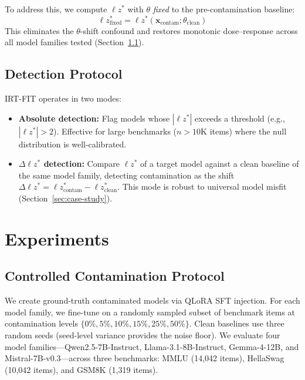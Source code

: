 \documentclass[11pt,a4paper]{article}
\begin{document}
To address this, we compute $\ell z^*$ with $\theta$ \emph{fixed} to the pre-contamination baseline:
\begin{equation}
\ell z^*_{\text{fixed}} = \ell z^*(\mathbf{x}_{\text{contam}} ; \theta_{\text{clean}})
\end{equation}
This eliminates the $\theta$-shift confound and restores monotonic dose--response across all model families tested (Section~\ref{sec:ctrl-contam}).

\subsection{Detection Protocol}

IRT-FIT operates in two modes:
\begin{itemize}
\item \textbf{Absolute detection:} Flag models whose $|\ell z^*|$ exceeds a threshold (e.g., $|\ell z^*| > 2$). Effective for large benchmarks ($n > 10$K items) where the null distribution is well-calibrated.
\item \textbf{$\Delta \ell z^*$ detection:} Compare $\ell z^*$ of a target model against a clean baseline of the same model family, detecting contamination as the shift $\Delta \ell z^* = \ell z^*_{\text{contam}} - \ell z^*_{\text{clean}}$. This mode is robust to universal model misfit (Section~\ref{sec:case-study}).
\end{itemize}


\section{Experiments}

\subsection{Controlled Contamination Protocol}
\label{sec:ctrl-contam}

We create ground-truth contaminated models via QLoRA SFT injection.
For each model family, we fine-tune on a randomly sampled subset of benchmark items at contamination levels $\{0\%, 5\%, 10\%, 15\%, 25\%, 50\%\}$.
Clean baselines use three random seeds (seed-level variance provides the noise floor).
We evaluate four model families---Qwen2.5-7B-Instruct, Llama-3.1-8B-Instruct, Gemma-4-12B, and Mistral-7B-v0.3---across three benchmarks: MMLU (14,042 items), HellaSwag (10,042 items), and GSM8K (1,319 items).
\end{document}
